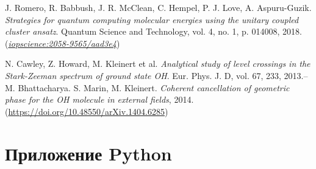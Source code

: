 \documentclass[a4paper]{report}
\begin{document}
\begin{thebibliography}{99}
    J. Romero, R. Babbush, J. R. McClean, C. Hempel, P. J. Love, A. Aspuru-Guzik. \textit{Strategies for quantum computing molecular energies using the unitary coupled cluster ansatz}. Quantum Science and Technology, vol. 4, no. 1, p. 014008, 2018.\\
    (\href{https://iopscience.iop.org/article/10.1088/2058-9565/aad3e4} {\textit{iopscience:2058-9565/aad3e4}})

    \label{Cawley2013}
    N. Cawley, Z. Howard, M. Kleinert et al. \textit{Analytical study of level crossings in the Stark-Zeeman spectrum of ground state OH}. Eur. Phys. J. D, vol. 67, 233, 2013.\;--\; M. Bhattacharya. S. Marin, M. Kleinert. \textit{Coherent cancellation of geometric phase for the OH molecule in external fields}, 2014.
    (\url{https://doi.org/10.48550/arXiv.1404.6285})

\end{thebibliography}


\chapter*{Приложение Python}
\end{document}
